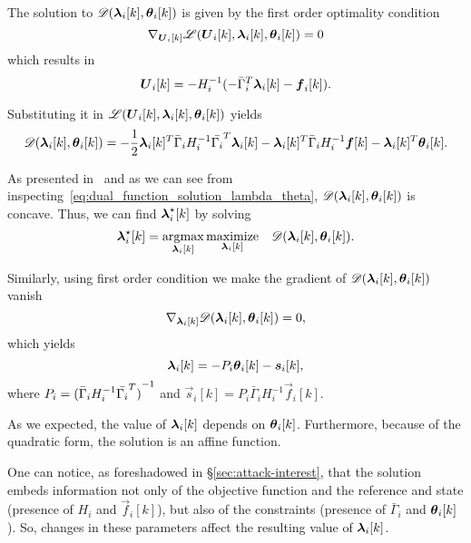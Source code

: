 \documentclass[../main.tex]{subfiles}
\begin{document}
The solution to $\dualfunction$ is given by the first order \KKT{} optimality condition
\begin{equation}
\nabla_{\vec{U}_{i}[k]}\lagrangian=0
\end{equation}
which results in
\begin{equation}
\boldsymbol{U}_{i}[k]=-H_{i}^{-1}(-\bar{\Gamma}_{i}^{T}\boldsymbol{\lambda}_i[k]-\boldsymbol{f}_{i}[k]).
\end{equation}

Substituting it in $\lagrangian$ yields
\begin{equation}
  \label{eq:dual_function_solution_lambda_theta}
\dualfunction=-\frac{1}{2}\lambdaik^{T}\linearcoefi\lambdaik-\lambdaik^{T}\bar{\Gamma}_{i}H_{i}^{-1}\vec{f}[k]-\lambdaik^{T}\thetaik.
\end{equation}

As presented in~\cite{BoydVandenberghe2004} and as we can see from inspecting~\eqref{eq:dual_function_solution_lambda_theta}, $\dualfunction$ is concave. Thus, we can find $\lambdaikstar$ by solving
\begin{equation}
  \begin{matrix}
    \lambdaikstar=\argmax\limits_{\lambdaik}\maximize\limits_{\lambdaik}&\dualfunction.
  \end{matrix}
\end{equation}

Similarly, using first order \KKT{} condition we make the gradient of $\dualfunction$ vanish
\begin{equation}
\nabla_{\lambdaik}\dualfunction=0,
\end{equation}
which yields
\begin{equation}
  \label{eq:lambda_function_theta}
  \lambdaik=-P_{i}\thetaik-\vec{s}_{i}[k],
\end{equation}
where $P_{i}={(\bar{\Gamma}_{i}H_{i}^{-1}\bar{\Gamma_{i}}^{T})}^{-1}$ and $\vec{s}_{i}[k]=P_{i}\bar{\Gamma}_{i}H_{i}^{-1}\vec{f}_{i}[k]$.

As we expected, the value of $\lambdaik$ depends on $\thetaik$.
Furthermore, because of the quadratic form, the solution is an affine function.

\begin{remark}
  One can notice, as foreshadowed in \S\ref{sec:attack-interest}, that the solution embeds information not only of the objective function and the reference and state (presence of $H_{i}$ and $\vec{f}_{i}[k]$), but also of the constraints (presence of $\bar{\Gamma}_{i}$ and $\thetaik$).
  So, changes in these parameters affect the resulting value of $\lambdaik$.
\end{remark}
\end{document}
